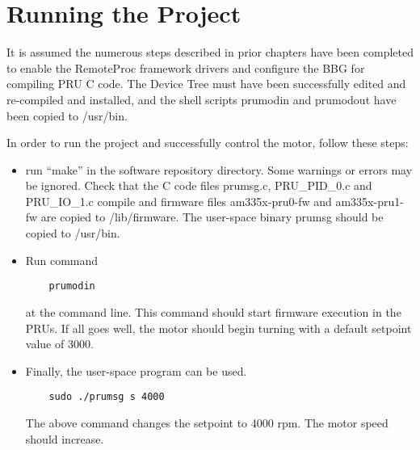 %
%
%

\chapter{Running the Project}

It is assumed the numerous steps described in prior chapters have been completed to enable the RemoteProc framework drivers and configure the BBG for compiling PRU C code.  The Device Tree must have been successfully edited and re-compiled and installed, and the shell scripts prumodin and prumodout have been copied to /usr/bin.

In order to run the project and successfully control the motor, follow these steps:

\begin{itemize}
	\item run ``make'' in the software repository directory.  Some warnings or errors may be ignored.  Check that the C code files prumsg.c, PRU\_PID\_0.c and PRU\_IO\_1.c compile and firmware files am335x-pru0-fw and am335x-pru1-fw are copied to /lib/firmware.  The user-space binary prumsg should be copied to /usr/bin.
	
	\item Run command 
	
	\begin{verbatim}
	prumodin
	\end{verbatim} 
	
	at the command line.  This command should start firmware execution in the PRUs.
	If all goes well, the motor should begin turning with a default setpoint value of 3000.
	
	\item  Finally, the user-space program can be used.
	
	\begin{verbatim}
	sudo ./prumsg s 4000
	\end{verbatim}
	
	The above command changes the setpoint to 4000 rpm.  The motor speed should increase.
\end{itemize}

